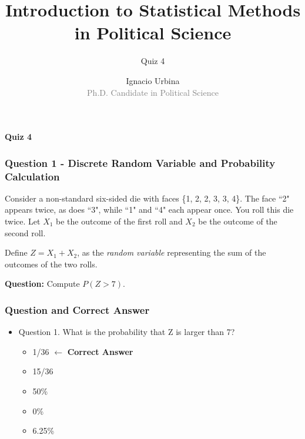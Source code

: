 \documentclass[handout]{beamer} %
\title{Introduction to Statistical Methods in Political Science}
\subtitle{Quiz 4}
\author{Ignacio Urbina \texorpdfstring{\\ \vspace{0.3em}}{ } \scriptsize \textcolor{gray}{Ph.D. Candidate in Political Science}}
\date{}
\newcommand{\transitionslide}[1]{
    \begin{frame}[plain]
        \centering
        \vspace{1cm}
        \Huge
        \textcolor{moonstoneblue!150}{\textbf{#1}}
    \end{frame}
}
\begin{document}
\frame{\titlepage}

\transitionslide{Quiz 4}

\begin{frame} \frametitle{Question 1 - Discrete Random Variable and Probability Calculation}
    Consider a non-standard six-sided die with faces \{1, 2, 2, 3, 3, 4\}. The face ``2" appears twice, as does ``3", while ``1" and ``4" each appear once. You roll this die twice. Let $X_1$ be the outcome of the first roll and $X_2$ be the outcome of the second roll.
    
    Define $Z = X_1 + X_2$, as the \emph{random variable} representing the sum of the outcomes of the two rolls.

    \vspace{2em}
    \textbf{Question:} Compute $P(Z > 7)$.
\end{frame}

\begin{frame} \frametitle{Question and Correct Answer}

\begin{itemize}
    \item Question 1. What is the probability that Z is larger than 7?
    \begin{itemize}
        \item 1/36 $\leftarrow$ \textbf{Correct Answer}
        \item 15/36
        \item 50\%
        \item 0\%
        \item 6.25\%
    \end{itemize}
\end{itemize}

\end{frame} %
\end{document}
